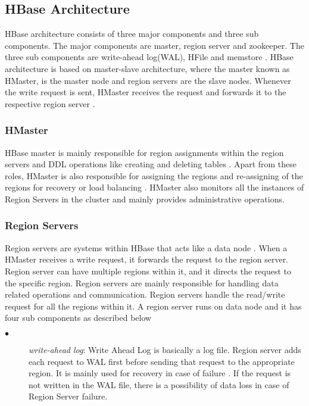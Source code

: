 \documentclass[11pt,a4paper,bibtotoc,idxtotoc,headsepline,footsepline,footexclude,BCOR12mm,DIV13]{scrbook}
\begin{document}

\newpage
\subsection{HBase Architecture}
\label{HBase Architecture}

HBase architecture consists of three major components and three sub components. The major components are master, region server and zookeeper. The three sub components are write-ahead log(WAL), HFile and memstore \cite{hbase:insights}. HBase architecture is based on master-slave architecture, where the master known as HMaster, is the master node and region servers are the slave nodes. Whenever the write request is sent, HMaster receives the request and forwards it to the respective region server \cite{hbase:insights}. 

\subsubsection{HMaster}
\label{hmaster}

HBase master is mainly responsible for region assignments within the region servers and DDL operations like creating and deleting tables \cite{hbase:architecture}. Apart from these roles, HMaster is also responsible for assigning the regions and re-assigning of the regions for recovery or load balancing \cite{hbase:architecture}. HMaster also monitors all the instances of Region Servers in the cluster \cite{hbase:architecture} and mainly provides administrative operations.

\subsubsection{Region Servers}
\label{region serves}

Region servers are systems within HBase that acts like a data node \cite{hbase:insights}. When a HMaster receives a write request, it forwards the request to the region server. Region server can have multiple regions within it, and it directs the request to the specific region. Region servers are mainly responsible for handling data related operations and communication. Region servers handle the read/write request for all the regions within it. 
A region server runs on data node and it has four sub components as described below \cite{hbase:architecture}
\begin{description}
	\item[$\bullet$]  \emph{write-ahead log}: Write Ahead Log is basically a log file. Region server adds each request to WAL first before sending that request to the appropriate region. It is mainly used for recovery in case of failure \cite{hbase:insights}. If the request is not written in the WAL file, there is a possibility of data loss in case of Region Server failure.
\end{description}
\end{document}
